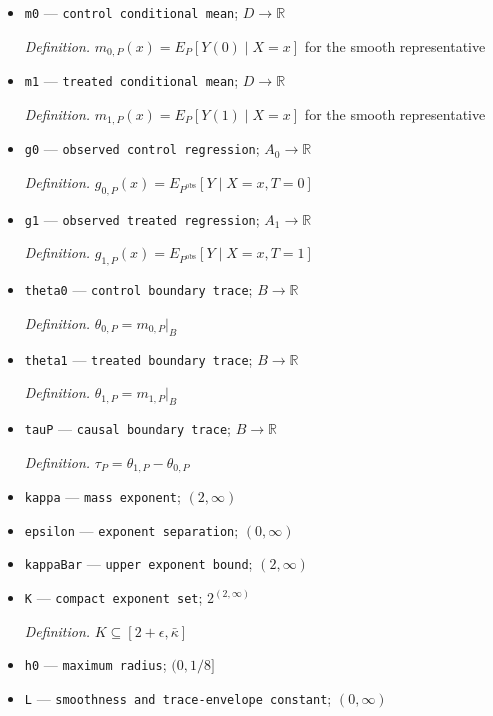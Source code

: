 \documentclass{article}
\begin{document}
\begin{itemize}
  \par\smallskip\noindent\emph{Definition.} \(P^{\mathrm{obs}}=P\circ O^{-1}\)
  \item \texttt{m0} --- \texttt{control conditional mean}; \(D\to\mathbb R\)
  \par\smallskip\noindent\emph{Definition.} \(m_{0,P}(x)=E_P[Y(0)\mid X=x]\) for the smooth representative
  \item \texttt{m1} --- \texttt{treated conditional mean}; \(D\to\mathbb R\)
  \par\smallskip\noindent\emph{Definition.} \(m_{1,P}(x)=E_P[Y(1)\mid X=x]\) for the smooth representative
  \item \texttt{g0} --- \texttt{observed control regression}; \(A_0\to\mathbb R\)
  \par\smallskip\noindent\emph{Definition.} \(g_{0,P}(x)=E_{P^{\mathrm{obs}}}[Y\mid X=x,T=0]\)
  \item \texttt{g1} --- \texttt{observed treated regression}; \(A_1\to\mathbb R\)
  \par\smallskip\noindent\emph{Definition.} \(g_{1,P}(x)=E_{P^{\mathrm{obs}}}[Y\mid X=x,T=1]\)
  \item \texttt{theta0} --- \texttt{control boundary trace}; \(B\to\mathbb R\)
  \par\smallskip\noindent\emph{Definition.} \(\theta_{0,P}=m_{0,P}|_B\)
  \item \texttt{theta1} --- \texttt{treated boundary trace}; \(B\to\mathbb R\)
  \par\smallskip\noindent\emph{Definition.} \(\theta_{1,P}=m_{1,P}|_B\)
  \item \texttt{tauP} --- \texttt{causal boundary trace}; \(B\to\mathbb R\)
  \par\smallskip\noindent\emph{Definition.} \(\tau_P=\theta_{1,P}-\theta_{0,P}\)
  \item \texttt{kappa} --- \texttt{mass exponent}; \((2,\infty)\)
  \item \texttt{epsilon} --- \texttt{exponent separation}; \((0,\infty)\)
  \item \texttt{kappaBar} --- \texttt{upper exponent bound}; \((2,\infty)\)
  \item \texttt{K} --- \texttt{compact exponent set}; \(2^{(2,\infty)}\)
  \par\smallskip\noindent\emph{Definition.} \(K\subseteq[2+\epsilon,\bar\kappa]\)
  \item \texttt{h0} --- \texttt{maximum radius}; \((0,1/8]\)
  \item \texttt{L} --- \texttt{smoothness and trace-\allowbreak{}envelope constant}; \((0,\infty)\)

\end{itemize}
\end{document}
